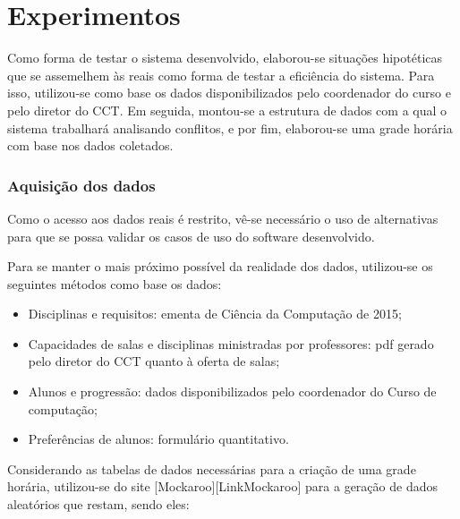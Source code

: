 \chapter{Experimentos}


Como forma de testar o sistema desenvolvido, elaborou-se situações hipotéticas que se assemelhem às reais como forma de testar a eficiência do sistema. Para isso, utilizou-se como base os dados disponibilizados pelo coordenador do curso e pelo diretor do CCT. Em seguida, montou-se a estrutura de dados com a qual o sistema trabalhará analisando conflitos, e por fim, elaborou-se uma grade horária com base nos dados coletados.

\subsection{Aquisição dos dados}


Como o acesso aos dados reais é restrito, vê-se necessário o uso de alternativas para que se possa validar os casos de uso do software desenvolvido.

Para se manter o mais próximo possível da realidade dos dados, utilizou-se os seguintes métodos como base os dados:

\begin{itemize}
    \item Disciplinas e requisitos: ementa de Ciência da Computação de 2015;
    \item Capacidades de salas e disciplinas ministradas por professores: pdf gerado pelo diretor do CCT quanto à oferta de salas;
    \item Alunos e progressão: dados disponibilizados pelo coordenador do Curso de computação;
    \item Preferências de alunos: formulário quantitativo.
\end{itemize}


Considerando as tabelas de dados necessárias para a criação de uma grade horária, utilizou-se do site [Mockaroo][LinkMockaroo] para a geração de dados aleatórios que restam, sendo eles:

